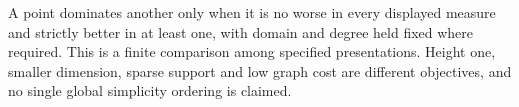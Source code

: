 A point dominates another only when it is no worse in every displayed
measure and strictly better in at least one, with domain and degree held
fixed where required. This is a finite comparison among specified
presentations. Height one, smaller dimension, sparse support and low graph
cost are different objectives, and no single global simplicity ordering is
claimed.
